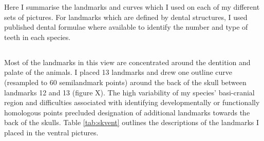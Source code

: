 Here I summarise the landmarks and curves which I used on each of my different sets of pictures. For landmarks which are defined by dental structures, I used published dental formulae \citep{Nowak1983, MacPhee1987, KnoxJones1992, Marshall1996, Nagorsen2002, Goodman2006, Asher2008, ADW2013} where available to identify the number and type of teeth in each species.

\subsection{}

Most of the landmarks in this view are concentrated around the dentition and palate of the animals. I placed 13 landmarks and drew one outline curve (resampled to 60 semilandmark points) around the back of the skull between landmarks 12 and 13 (figure X). The high variability of my species’ basi-cranial region and difficulties associated with identifying developmentally or functionally homologous points precluded designation of additional landmarks towards the back of the skulls. Table \ref{tab:skvent} outlines the descriptions of the landmarks I placed in the ventral pictures.

